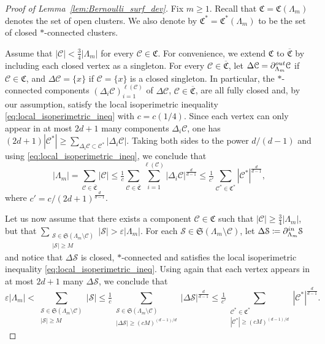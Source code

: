 \documentclass[11pt,a4paper]{article}
\theoremstyle{definition}
\numberwithin{equation}{section}
\begin{document}
\begin{proof}[Proof of Lemma~\textup{\ref{lem:Bernoulli_surf_dev}}]
Fix $m\geq1$. Recall that $\mathfrak{C}=\mathfrak{C}(\Lambda_m)$ denotes the set of open clusters.  We also denote by $\mathfrak{C}^*=\mathfrak{C}^*(\Lambda_m)$ to be the set of closed $*$-connected clusters. 

Assume that $|\mathcal{C}|< \tfrac{3}{4}|\Lambda_m|$ for every $\mathcal{C}\in\mathfrak{C}$. For convenience, we extend $\mathfrak{C}$ to $\overline{\mathfrak{C}}$ by including each closed vertex as a singleton. For every $\mathcal{C}\in \overline{\mathfrak{C}}$, let $\Delta \mathcal{C}=\partial^{\rm out}_{\Lambda_m} \mathcal{C}$ if $\mathcal{C}\in\mathfrak{C}$, and $\Delta \mathcal{C}=\{x\}$ if $\mathcal{C}=\{x\}$ is a closed singleton. In particular, the $*$-connected components $(\Delta_i \mathcal{C})_{i=1}^{\ell(\mathcal{C})}$ of $\Delta \mathcal{C}$, $\mathcal{C}\in \overline{\mathfrak{C}}$, are all fully closed and, by our assumption, satisfy the local isoperimetric inequality \eqref{eq:local_isoperimetric_ineq} with $c=c(1/4)$. Since each vertex can only appear in at most $2d+1$ many components $\Delta_i \mathcal{C}$, one has $(2d+1)|\mathcal{C}^*|\geq \sum_{\Delta_i \mathcal{C} \subset \mathcal{C}^* } |\Delta_i \mathcal{C}|$. Taking both sides to the power $d/(d-1)$ and using \eqref{eq:local_isoperimetric_ineq}, we conclude that
\begin{equation}
|\Lambda_m|=\sum_{\mathcal{C}\in\overline{\mathfrak{C}}} |\mathcal{C}| \leq \tfrac{1}{c} \sum_{\mathcal{C}\in\overline{\mathfrak{C}}} \sum_{i=1}^{\ell(\mathcal{C})} |\Delta_i \mathcal{C}|^{\frac{d}{d-1}} \leq \tfrac{1}{c'} \sum_{\mathcal{C}^*\in \mathfrak{C}^*} |\mathcal{C}^*|^{\frac{d}{d-1}},
\end{equation}
where $c'=c/(2d+1)^{\frac{d}{d-1}}$. 

Let us now assume that there exists a component $\mathcal{C}\in\mathfrak{C}$ such that $|\mathcal{C}|\geq \tfrac{3}{4}|\Lambda_m|$, but that $\sum_{\substack{\mathcal{S}\in\mathfrak{S}(\Lambda_m\setminus \mathcal{C})\\ |\mathcal{S}|\geq M}} |\mathcal{S}| > \varepsilon|\Lambda_m|$. 
For each $\mathcal{S}\in\mathfrak{S}(\Lambda_m\setminus \mathcal{C})$, let $\Delta \mathcal{S} \coloneqq \partial_{\Lambda_m}^{\rm in} \mathcal{S}$ and notice that $\Delta \mathcal{S}$ is closed, $*$-connected and satisfies the local isoperimetric inequality \eqref{eq:local_isoperimetric_ineq}. Using again that each vertex appears in at most $2d+1$ many $\Delta \mathcal{S}$, we conclude that
\begin{equation}
\varepsilon|\Lambda_m|< \sum_{ \substack{\mathcal{S}\in\mathfrak{S}(\Lambda_m\setminus \mathcal{C})\\ |\mathcal{S}|\geq M}} |\mathcal{S}| \leq \tfrac{1}{c} \sum_{ \substack{\mathcal{S}\in\mathfrak{S}(\Lambda_m\setminus \mathcal{C})\\ |\Delta \mathcal{S}|\geq (cM)^{(d-1)/d} }} |\Delta \mathcal{S}|^{\frac{d}{d-1}} \leq \tfrac{1}{c'} \sum_{\substack{ \mathcal{C}^*\in \mathfrak{C}^* \\ |\mathcal{C}^*|\geq (cM)^{(d-1)/d} }} |\mathcal{C}^*|^{\frac{d}{d-1}}.
\end{equation}



\end{proof}
\end{document}
